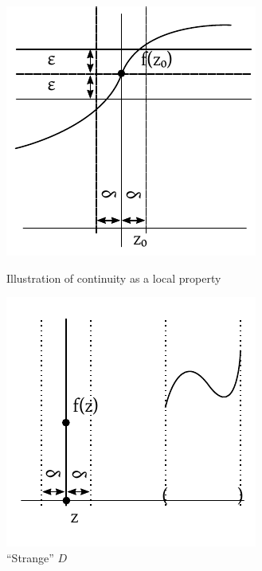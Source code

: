 \documentclass[a4paper,landscape,twocolumn]{article}
\theoremstyle{definition}
\begin{document}
\begin{figure}[p]
  \begin{center}
    \includegraphics{img/continuity_illustrated.pdf}
    \caption{Illustration of continuity as a local property}
  \end{center}
  \begin{center}
    \includegraphics{img/strange_D.pdf}
    \caption{\enquote{Strange} $D$}
    \label{img:strD}
  \end{center}
\end{figure}
\end{document}
